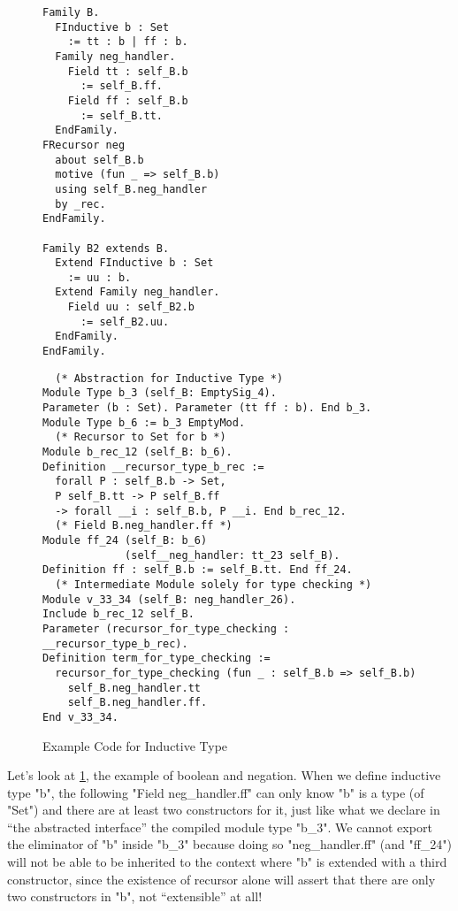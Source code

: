 \begin{figure}[!htb]
  \begin{minipage}[t]{0.3\linewidth}
\begin{verbatim}
Family B.
  FInductive b : Set 
    := tt : b | ff : b.
  Family neg_handler. 
    Field tt : self_B.b 
      := self_B.ff.
    Field ff : self_B.b 
      := self_B.tt.
  EndFamily.
FRecursor neg 
  about self_B.b 
  motive (fun _ => self_B.b)
  using self_B.neg_handler
  by _rec.
EndFamily.

Family B2 extends B.
  Extend FInductive b : Set 
    := uu : b.
  Extend Family neg_handler.
    Field uu : self_B2.b 
      := self_B2.uu.
  EndFamily. 
EndFamily.
\end{verbatim}
  \end{minipage}
  \begin{minipage}[t]{0.65\linewidth}
\begin{verbatim}
  (* Abstraction for Inductive Type *)
Module Type b_3 (self_B: EmptySig_4).
Parameter (b : Set). Parameter (tt ff : b). End b_3.      
Module Type b_6 := b_3 EmptyMod.
  (* Recursor to Set for b *)
Module b_rec_12 (self_B: b_6).
Definition __recursor_type_b_rec :=
  forall P : self_B.b -> Set,
  P self_B.tt -> P self_B.ff 
  -> forall __i : self_B.b, P __i. End b_rec_12. 
  (* Field B.neg_handler.ff *)
Module ff_24 (self_B: b_6) 
             (self__neg_handler: tt_23 self_B).
Definition ff : self_B.b := self_B.tt. End ff_24.
  (* Intermediate Module solely for type checking *)
Module v_33_34 (self_B: neg_handler_26).
Include b_rec_12 self_B.
Parameter (recursor_for_type_checking : __recursor_type_b_rec).
Definition term_for_type_checking :=
  recursor_for_type_checking (fun _ : self_B.b => self_B.b)
    self_B.neg_handler.tt
    self_B.neg_handler.ff.  
End v_33_34.
\end{verbatim}
  \end{minipage}
\caption{Example Code for Inductive Type}\label{fig:plugin-example2}
\end{figure}

Let's look at \cref{fig:plugin-example2}, the example of boolean and negation. When we define inductive type "b", the following "Field neg_handler.ff" can only know "b" is a type (of "Set") and there are at least two constructors for it, just like what we declare in ``the abstracted interface'' the compiled module type "b_3". We cannot export the eliminator of "b" inside "b_3" because doing so "neg_handler.ff" (and "ff_24") will not be able to be inherited to the context where "b" is extended with a third constructor, since the existence of recursor alone will assert that there are only two constructors in "b", not ``extensible'' at all!   

